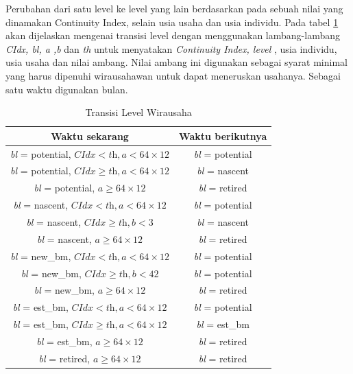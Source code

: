 Perubahan dari satu level ke level yang lain berdasarkan pada sebuah nilai yang dinamakan Continuity Index, selain usia usaha dan usia individu. Pada tabel \ref{tabelLW} akan dijelaskan mengenai transisi level dengan menggunakan lambang-lambang \textit{CIdx, bl, a ,b} dan \textit{th} untuk menyatakan \textit{Continuity Index, level} , usia individu, usia usaha dan nilai ambang. Nilai ambang ini digunakan sebagai syarat minimal yang harus dipenuhi wirausahawan untuk dapat meneruskan usahanya. Sebagai satu waktu digunakan bulan.

\begin{table}[H]
\centering
\caption{Transisi Level Wirausaha}
\begin{tabular}{|c|c|}
\hline
Waktu sekarang & Waktu berikutnya \\
\hline
\textit{bl} = potential, $ \textit{CIdx} < \textit{th}, \textit{a} < 64 \times 12$ & \textit{bl} = potential \\
\hline
\textit{bl} = potential, $\textit{CIdx} \geq \textit{th}, \textit{a} < 64 \times 12$ & \textit{bl} = nascent \\
\hline
\textit{bl} = potential, $\textit{a} \geq 64 \times 12$ & \textit{bl} = retired \\
\hline
\textit{bl} = nascent, $\textit{CIdx} < \textit{th}, \textit{a} <64 \times 12$ & \textit{bl} = potential \\
\hline
\textit{bl} = nascent, $\textit{CIdx} \geq \textit{th}, \textit{b} < 3$ & \textit{bl} = nascent \\
\hline
\textit{bl} = nascent, $\textit{a} \geq 64 \times 12$ & \textit{bl} = retired \\
\hline
\textit{bl} = new\_bm, $\textit{CIdx} < \textit{th}, \textit{a} < 64 \times 12$ & \textit{bl} = potential \\
\hline
\textit{bl} = new\_bm, $\textit{CIdx} \geq \textit{th}, \textit{b} < 42$ & \textit{bl} = potential \\
\hline
\textit{bl} = new\_bm, $\textit{a} \geq 64 \times 12$ & \textit{bl} = retired \\
\hline
\textit{bl} = est\_bm, $\textit{CIdx} < \textit{th}, \textit{a} < 64 \times 12$ & \textit{bl} = potential \\
\hline
\textit{bl} = est\_bm, $\textit{CIdx} \geq \textit{th}, \textit{a} < 64 \times 12$ & \textit{bl} = est\_bm \\
\hline
\textit{bl} = est\_bm, $\textit{a} \geq 64 \times 12$ & \textit{bl} = retired \\
\hline
\textit{bl} = retired, $\textit{a} \geq 64 \times 12$ & \textit{bl} = retired \\
\hline
\end{tabular}
\label{tabelLW}
\end{table}


